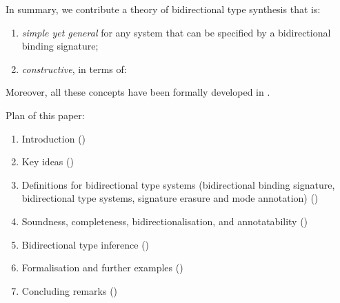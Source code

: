 In summary, we contribute a theory of bidirectional type synthesis that is:
\begin{enumerate}
  \item \emph{simple yet general} for any system that can be specified by a bidirectional binding signature;
  \item \emph{constructive}, in terms of: 
\end{enumerate}
Moreover, all these concepts have been formally developed in \Agda.

Plan of this paper:
\begin{enumerate}
  \item Introduction () 
  \item Key ideas ()
  \item Definitions for bidirectional type systems (bidirectional binding signature, bidirectional type systems, signature erasure and mode annotation) ()
  \item Soundness, completeness, bidirectionalisation, and annotatability ()
  \item Bidirectional type inference ()
  \item Formalisation and further examples ()
  \item Concluding remarks ()
     
\end{enumerate}




